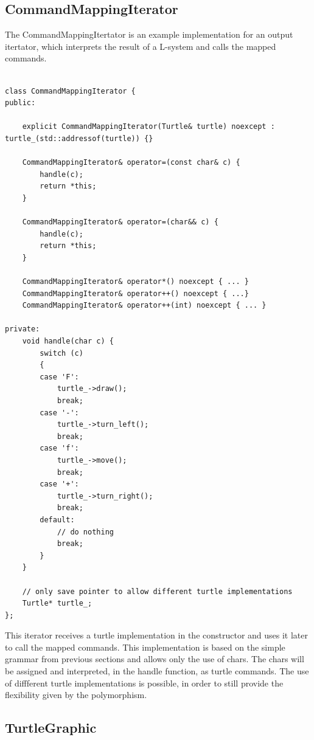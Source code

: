 \documentclass[english]{cpp-hmwk}
\begin{document}
\subsection{CommandMappingIterator}

The CommandMappingItertator is an example implementation for an output itertator, which interprets the result of a L-system and calls the mapped commands. 

\medskip
\begin{lstlisting}

class CommandMappingIterator {
public:

    explicit CommandMappingIterator(Turtle& turtle) noexcept : turtle_(std::addressof(turtle)) {}

    CommandMappingIterator& operator=(const char& c) {
        handle(c);
        return *this;
    }

    CommandMappingIterator& operator=(char&& c) {
        handle(c);
        return *this;
    }

    CommandMappingIterator& operator*() noexcept { ... }
    CommandMappingIterator& operator++() noexcept { ...}
    CommandMappingIterator& operator++(int) noexcept { ... }

private:
    void handle(char c) {
        switch (c)
        {
        case 'F':
            turtle_->draw();
            break;
        case '-':
            turtle_->turn_left();
            break;
        case 'f':
            turtle_->move();
            break;
        case '+':
            turtle_->turn_right();
            break;
        default:
            // do nothing
            break;
        }
    }

    // only save pointer to allow different turtle implementations
    Turtle* turtle_;
};

\end{lstlisting}

\noindent This iterator receives a turtle implementation in the constructor and uses it later to call the mapped commands. This implementation is based on the simple grammar from previous sections and allows only the use of chars. The chars will be assigned and interpreted, in the handle function, as turtle commands. The use of diffferent turtle implementations is possible, in order to still provide the flexibility given by the polymorphism.

\subsection{TurtleGraphic}
\end{document}
